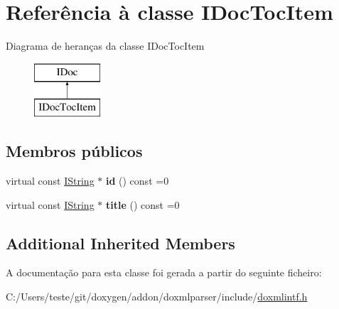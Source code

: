 \hypertarget{class_i_doc_toc_item}{\section{Referência à classe I\-Doc\-Toc\-Item}
\label{class_i_doc_toc_item}
}
Diagrama de heranças da classe I\-Doc\-Toc\-Item\begin{figure}[H]
\begin{center}
\leavevmode
\includegraphics[height=2.000000cm]{class_i_doc_toc_item}
\end{center}
\end{figure}
\subsection*{Membros públicos}
\begin{DoxyCompactItemize}
\item 
\hypertarget{class_i_doc_toc_item_aaba28daa272dce8bc14dde330d5b0126}{virtual const \hyperlink{class_i_string}{I\-String} $\ast$ {\bfseries id} () const =0}\label{class_i_doc_toc_item_aaba28daa272dce8bc14dde330d5b0126}

\item 
\hypertarget{class_i_doc_toc_item_ab8ea72b0b2ad8ac6d7feebdab99018d4}{virtual const \hyperlink{class_i_string}{I\-String} $\ast$ {\bfseries title} () const =0}\label{class_i_doc_toc_item_ab8ea72b0b2ad8ac6d7feebdab99018d4}

\end{DoxyCompactItemize}
\subsection*{Additional Inherited Members}


A documentação para esta classe foi gerada a partir do seguinte ficheiro\-:\begin{DoxyCompactItemize}
\item 
C\-:/\-Users/teste/git/doxygen/addon/doxmlparser/include/\hyperlink{include_2doxmlintf_8h}{doxmlintf.\-h}\end{DoxyCompactItemize}

